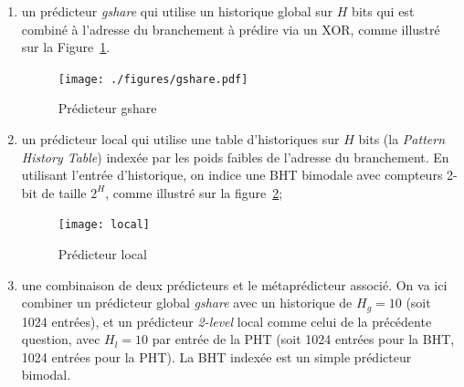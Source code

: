 \documentclass[a4paper]{article}
\begin{document}
\begin{enumerate}



\item un prédicteur \textit{gshare} qui utilise un historique global sur $H$ bits qui est combiné à l'adresse du branchement à prédire via un XOR, comme illustré sur la Figure~\ref{correlated}. 
      \begin{figure}[hbt]\center\leavevmode
      \texttt{[image: ./figures/gshare.pdf]}
      \caption{\label{correlated}Prédicteur gshare}
      \end{figure}

\item un prédicteur local qui utilise une table d'historiques sur $H$ bits (la \textit{Pattern History Table}) indexée par les poids faibles de l'adresse du branchement.  En utilisant l'entrée d'historique, on indice une BHT bimodale avec compteurs 2-bit de taille $2^H$, comme illustré sur la figure~\ref{local};
      \begin{figure}[hbt]\center\leavevmode
      \texttt{[image: local]}
      \caption{Prédicteur local}
      \label{local}
      \end{figure}

\item une combinaison de deux prédicteurs et le métaprédicteur associé. On va ici combiner un prédicteur global \textit{gshare} avec un historique de $H_g=10$ (soit 1024 entrées), et un prédicteur \textit{2-level} local comme celui de la précédente question, avec $H_l=10$ par entrée de la PHT (soit 1024 entrées pour la BHT, 1024 entrées pour la PHT).
La BHT indexée est un simple prédicteur bimodal.


\end{enumerate}
\end{document}
